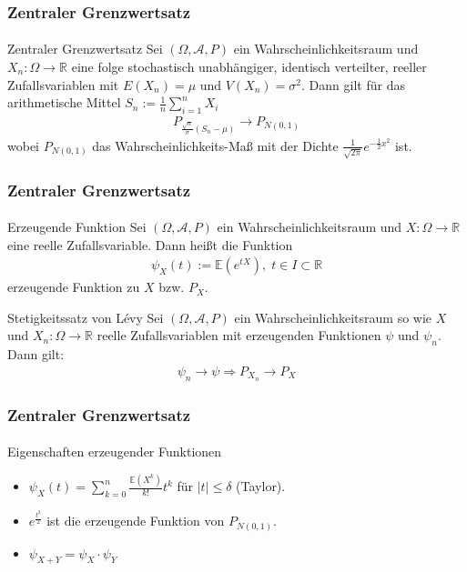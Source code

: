 \documentclass{beamer}
\begin{document}
\begin{frame}
    \frametitle{Zentraler Grenzwertsatz}
\framesubtitle{}

\begin{block}{Zentraler Grenzwertsatz}
Sei $(\Omega, \mathcal{A}, P)$ ein Wahrscheinlichkeitsraum und $X_n :  \Omega \to \mathbb{R}$  eine folge stochastisch unabhängiger, identisch verteilter, reeller Zufallsvariablen mit $E(X_n) = \mu$ und $V(X_n)= \sigma^2$. Dann gilt für das arithmetische Mittel $S_n:= \frac{1}{n} \sum_{i=1}^n X_i$
\begin{align*}
P_{ \frac{\sqrt{n}}{\sigma} (S_n-\mu)} \to P_{N(0,1)}
\end{align*}
wobei $ P_{N(0,1)}$ das Wahrscheinlichkeits-Maß mit der Dichte $ \frac {1}{ \sqrt{2\pi}}e^{- \frac {1}{2} x^2}$ ist.
\end{block}

 \end{frame}



\begin{frame}
    \frametitle{Zentraler Grenzwertsatz}
\framesubtitle{}

\begin{block}{Erzeugende Funktion}
Sei $(\Omega, \mathcal{A}, P)$ ein Wahrscheinlichkeitsraum und $X :  \Omega \to \mathbb{R}$  eine reelle Zufallsvariable. Dann heißt die Funktion 
\begin{align*}
\psi_X(t) := \mathbb{E}(e^{tX}), \; t \in I \subset \mathbb{R}
\end{align*}
erzeugende Funktion zu $X$ bzw. $P_X$.
\end{block}

\begin{block}{Stetigkeitssatz von  Lévy }
Sei $(\Omega, \mathcal{A}, P)$ ein Wahrscheinlichkeitsraum so wie  $X$ und $X_n :  \Omega \to \mathbb{R}$   reelle Zufallsvariablen mit erzeugenden Funktionen $\psi$ und $\psi_{n}$. Dann gilt:
\begin{align*}
\psi_n \to \psi \Rightarrow P_{X_n} \to P_X 
\end{align*}
\end{block}

 \end{frame}

\begin{frame}
    \frametitle{Zentraler Grenzwertsatz}
\framesubtitle{}
\begin{block}{Eigenschaften erzeugender Funktionen}
\begin{itemize}
\item $\psi_X(t) = \sum_{k= 0}^n \frac{\mathbb{E}(X^k)}{k!} t^k$ für $|t| \leq \delta$ (Taylor).
\item $e^{\frac{t^2}{2}}$ ist die erzeugende Funktion von $ P_{N(0,1)}$.
\item $\psi_{X +Y} = \psi_X \cdot \psi_Y$
\end{itemize}

\end{block}


 \end{frame}
\end{document}
